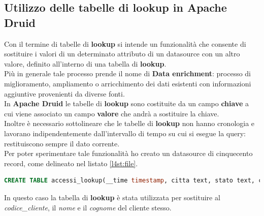 \subsection{Utilizzo delle tabelle di lookup in Apache Druid}
Con il termine di tabelle di \textbf{lookup} si intende un funzionalità che consente di sostituire i valori 
di un determinato attributo di un \gls{datasource}{} con un altro valore, definito all'interno di una tabella di \textbf{lookup}.\\
Più in generale tale processo prende il nome di \textbf{Data enrichment}: processo di miglioramento, ampliamento o arricchimento dei dati esistenti con informazioni 
aggiuntive provenienti da diverse fonti. \\
In \textbf{Apache Druid} le tabelle di \textbf{lookup} sono costituite da un campo \textbf{chiave} a cui viene associato un campo \textbf{valore} che andrà a sostituire la chiave.\\
Inoltre è necessario sottolineare che le tabelle di \textbf{lookup} non hanno cronologia e lavorano indipendentemente dall'intervallo di tempo su cui si esegue la query: restituiscono sempre il dato corrente.\\
Per poter sperimentare tale funzionalità ho creato un \gls{datasource}{} di cinquecento record, come delineato nel listato \ref{l4st:file}.
\begin{lstlisting}[language=SQL, caption=\texttt{table\_lookup.sql}, label=l4st:file]
  CREATE TABLE accessi_lookup(__time timestamp, citta text, stato text, codice_cliente text);
\end{lstlisting}
In questo caso la tabella di \textbf{lookup} è stata utilizzata per  sostituire al \textit{codice\_cliente}, il \textit{nome} e il \textit{cognome} del cliente stesso.
